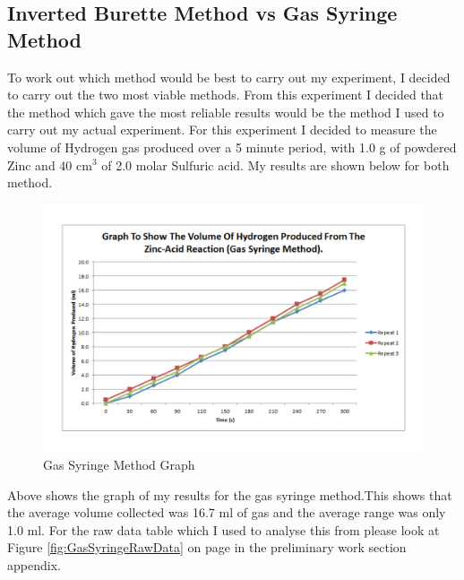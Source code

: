 	\subsection{Inverted Burette Method vs Gas Syringe Method} 

To work out which method would be best to carry out my experiment, I decided to carry out the two most viable methods. From this experiment I decided that the method which gave the most reliable results would be the method I used to carry out my actual experiment. For this experiment I decided to measure the volume of Hydrogen gas produced over a 5 minute period, with 1.0 g of powdered Zinc and 40 cm$^3$ of 2.0 molar Sulfuric acid. My results are shown below for both method.

\begin{figure}[H]
    \includegraphics[width=\textwidth]{./preliminarywork/Graphs/GasSyringe.pdf}
    \caption{Gas Syringe Method Graph} \label{fig:Gas Syringe Method Results}
\end{figure}

Above shows the graph of my results for the gas syringe method.This shows that the average volume collected was 16.7 ml of gas and the average range was only 1.0 ml. For the raw data table which I used to analyse this from please look at Figure \ref{fig:GasSyringeRawData} on page \pageref{fig:GasSyringeRawData} in the preliminary work section appendix.





